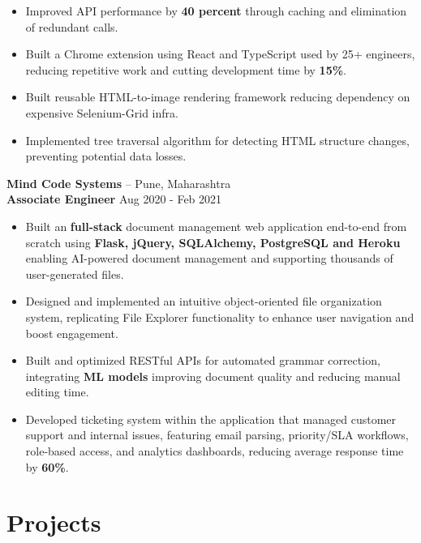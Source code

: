 \documentclass[11pt]{article}       %
\begin{document}
\begin{itemize}
  \item Improved API performance by \textbf{40 percent} through caching and elimination of redundant calls. \\
  \item Built a Chrome extension using React and TypeScript used by 25+ engineers, reducing repetitive work and cutting development time by \textbf{15\%}. \\
  \item Built reusable HTML-to-image rendering framework reducing dependency on expensive Selenium-Grid infra. \\
  \item Implemented tree traversal algorithm for detecting HTML structure changes, preventing potential data losses. \\
\end{itemize}

\textbf{Mind Code Systems} -- Pune, Maharashtra \\

\textbf{Associate Engineer} \hfill Aug 2020 - Feb 2021 \\

\begin{itemize}
  \item Built an \textbf{full-stack} document management web application end-to-end from scratch using \textbf{Flask, jQuery, SQLAlchemy, PostgreSQL and Heroku} enabling AI-powered document management and supporting thousands of user-generated files. \\
  \item Designed and implemented an intuitive object-oriented file organization system, replicating File Explorer functionality to enhance user navigation and boost engagement. \\
  \item Built and optimized RESTful APIs for automated grammar correction, integrating \textbf{ML models} improving document quality and reducing manual editing time. \\
  \item Developed ticketing system within the application that managed customer support and internal issues, featuring email parsing, priority/SLA workflows, role-based access, and analytics dashboards, reducing average response time by \textbf{60\%}. \\  
\end{itemize}

\section*{Projects}
\end{document}
